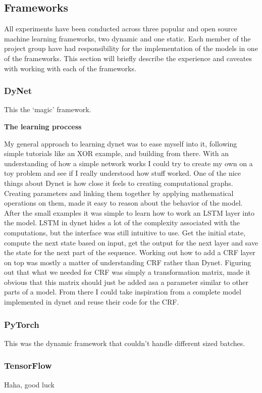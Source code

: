 

\subsection{Frameworks}

All experiments have been conducted across three popular and open source machine
learning frameworks, two dynamic and one static. Each member of the project
group have had responsibility for the implementation of the models in one of the
frameworks. This section will briefly describe the experience and caveates with
working with each of the frameworks.


\subsubsection{DyNet}

This the `magic' framework.


\textbf{The learning proccess}

My general approach to learning dynet was to ease myself into it, following simple tutorials like an XOR example, and building from there.
With an understanding of how a simple network works I could try to create my own on a toy problem and see if I really understood how stuff worked. 
One of the nice things about Dynet is how close it feels to creating computational graphs. 
Creating parameters and linking them together by applying mathematical operations on them, made it easy to reason about the behavior of the model.
After the small examples it was simple to learn how to work an LSTM layer into the model.
LSTM in dynet hides a lot of the complexity associated with the computations, but the interface was still intuitive to use.
Get the initial state, compute the next state based on input, get the output for the next layer and save the state for the next part of the sequence.
Working out how to add a CRF layer on top was mostly a matter of understanding CRF rather than Dynet. 
Figuring out that what we needed for CRF was simply a transformation matrix, made it obvious that this matrix should just be added asa a parameter similar to other parts of a model.
From there I could take inspiration from a complete model implemented in dynet and reuse their code for the CRF.

\subsubsection{PyTorch}

This was the dynamic framework that couldn't handle different sized batches.


\subsubsection{TensorFlow}

Haha, good luck


